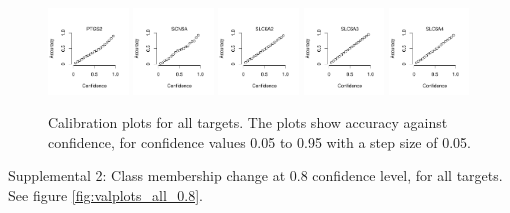 \documentclass[utf8]{frontiersSCNS} %
\begin{document}
\begin{figure}[h!]
\includegraphics[width=0.19\textwidth]{figures/calibration_plots/ptgs2_calib.pdf}
\includegraphics[width=0.19\textwidth]{figures/calibration_plots/scn5a_calib.pdf}
\includegraphics[width=0.19\textwidth]{figures/calibration_plots/slc6a2_calib.pdf}
\includegraphics[width=0.19\textwidth]{figures/calibration_plots/slc6a3_calib.pdf}
\vspace*{-15pt} %
\includegraphics[width=0.19\textwidth]{figures/calibration_plots/slc6a4_calib.pdf}
    \caption{Calibration plots for all targets. The plots show accuracy against
        confidence, for confidence values 0.05 to 0.95 with a step size of 0.05.}
    \label{fig:calibration_plots_all}
\end{figure}

Supplemental 2: Class membership change at 0.8 confidence level, for all
targets. See figure \ref{fig:valplots_all_0.8}.
\end{document}

